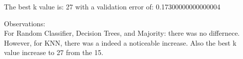 \documentclass[10pt]{article}
\begin{document}
\begin{flushleft}
The best k value is: 27 with a validation error of: 0.17300000000000004 \\

\hspace{1 cm}

Observations: \\
For Random Classifier, Decision Trees, and Majority: there was no differnece. \\
However, for KNN, there was a indeed a noticeable increase. Also the best k value increase to 27 from the 15. \\

\end{flushleft}
\end{document}
